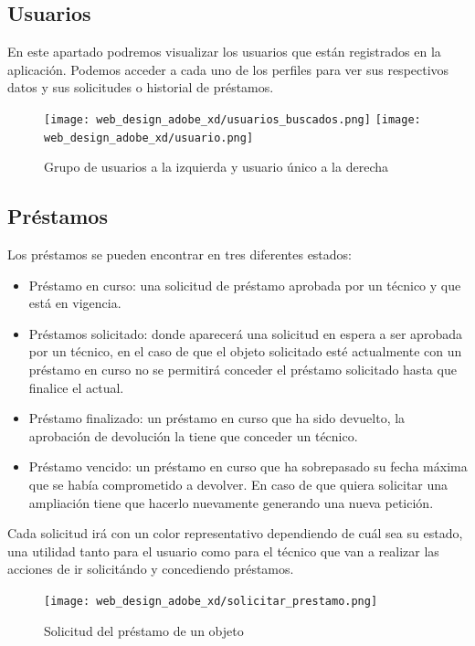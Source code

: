 \subsection{Usuarios}

En este apartado podremos visualizar los usuarios que están registrados en la aplicación. Podemos acceder a cada uno de los perfiles para ver sus respectivos datos y sus solicitudes o historial de préstamos.

\begin{figure}[H]
    \begin{center}
        \texttt{[image: web\_design\_adobe\_xd/usuarios\_buscados.png]}
        \texttt{[image: web\_design\_adobe\_xd/usuario.png]}
        \caption{Grupo de usuarios a la izquierda y usuario único a la derecha}
    \end{center}
\end{figure}

\subsection{Préstamos}

Los préstamos se pueden encontrar en tres diferentes estados:

\begin{itemize}
    \item Préstamo en curso: una solicitud de préstamo aprobada por un técnico y que está en vigencia.
    \item Préstamos solicitado: donde aparecerá una solicitud en espera a ser aprobada por un técnico, en el caso de que el objeto solicitado esté actualmente con un préstamo en curso no se permitirá conceder el préstamo solicitado hasta que finalice el actual.
    \item Préstamo finalizado: un préstamo en curso que ha sido devuelto, la aprobación de devolución la tiene que conceder un técnico.
    \item Préstamo vencido: un préstamo en curso que ha sobrepasado su fecha máxima que se había comprometido a devolver. En caso de que quiera solicitar una ampliación tiene que hacerlo nuevamente generando una nueva petición.
\end{itemize}

Cada solicitud irá con un color representativo dependiendo de cuál sea su estado, una utilidad tanto para el usuario como para el técnico que van a realizar las acciones de ir solicitándo y concediendo préstamos.

\begin{figure}[htbp]
    \centering
        \texttt{[image: web\_design\_adobe\_xd/solicitar\_prestamo.png]}
        \caption{Solicitud del préstamo de un objeto}
\end{figure}

